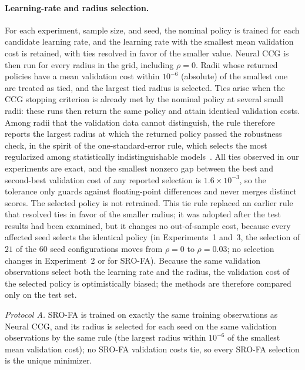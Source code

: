 \paragraph{Learning-rate and radius selection.} For each experiment, sample size, and seed, the nominal policy
is trained for each candidate learning rate, and the learning rate with the smallest mean validation cost is
retained, with ties resolved in favor of the smaller value. Neural CCG is then run for every radius in the
grid, including $\rho=0$. Radii whose returned policies have a mean validation cost within $10^{-6}$ (absolute)
of the smallest one are treated as tied, and the largest tied radius is selected. Ties arise when the CCG
stopping criterion is already met by the nominal policy at several small radii: these runs then return the
same policy and attain identical validation costs. Among radii that the validation data cannot distinguish,
the rule therefore reports the largest radius at which the returned policy passed the robustness check, in the
spirit of the one-standard-error rule, which selects the most regularized among statistically
indistinguishable models~\cite{Breiman1984CART,Hastie2009ESL}. All ties observed in our experiments are exact,
and the smallest nonzero gap between the best and second-best validation cost of any reported selection is
$1.6\times10^{-3}$, so the tolerance only guards against floating-point differences and never merges distinct
scores. The selected policy is not retrained. This tie rule replaced an earlier rule that resolved ties in
favor of the smaller radius; it was adopted after the test results had been examined, but it changes no
out-of-sample cost, because every affected seed selects the identical policy (in Experiments~1 and~3, the
selection of $21$ of the $60$ seed configurations moves from $\rho=0$ to $\rho=0.03$; no selection changes in
Experiment~2 or for SRO-FA). Because the same validation observations select both the learning rate and the
radius, the validation cost of the selected policy is optimistically biased; the methods are therefore
compared only on the test set.

\emph{Protocol A.} SRO-FA is trained on exactly the same training observations as Neural CCG, and its radius
is selected for each seed on the same validation observations by the same rule (the largest radius within
$10^{-6}$ of the smallest mean validation cost); no SRO-FA validation costs tie, so every SRO-FA selection
is the unique minimizer.

